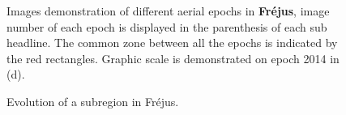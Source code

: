 \begin{figure}[htbp]
\begin{center}
{\begin{minipage}[t]{0.46\linewidth}
    \end{minipage}%
}
        \caption{Images demonstration of different aerial epochs in \textbf{Fr{\'e}jus}, image number of each epoch is displayed in the parenthesis of each sub headline. The common zone between all the epochs is indicated by the red rectangles. Graphic scale is demonstrated on epoch 2014 in (d).}
        \label{FrejusData}
    \end{center}
\end{figure} 

\begin{figure}[htbp]
	\begin{center}
		\caption{Evolution of a subregion in Fr{\'e}jus.}
		\label{FrejusEvolution}
	\end{center}
\end{figure} 

